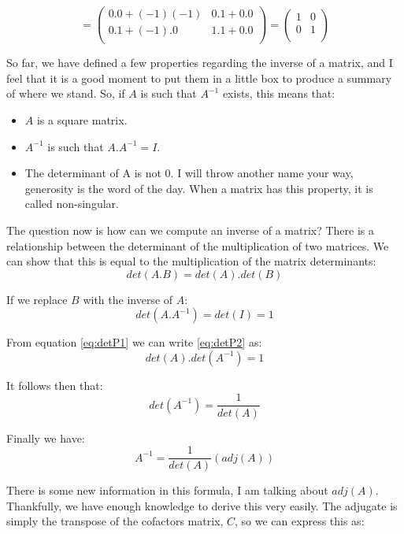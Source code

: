 \documentclass[a4,12pt,twosided,openany]{memoir}
\begin{document}
\[ = \begin{pmatrix}
0.0 + (-1)(-1) & 0.1 + 0.0\\
0.1 + (-1).0  & 1.1 + 0.0\\
\end{pmatrix} = \begin{pmatrix}
1 & 0\\
0 & 1\\
\end{pmatrix}\]
\par 
\indent
So far, we have defined a few properties regarding the inverse of a matrix, and I feel that it is a good moment to put them in a little box to produce a summary of where we stand. So, if $A$ is such that $A^{−1}$ exists, this means that:
\begin{tcolorbox}
\begin{itemize}
\item $A$ is a square matrix.
\item $A^{-1}$ is such that $A.A^{-1} = I $.
\item The determinant of A is not 0. I will throw another name your way, generosity is the word of the day. When a matrix has this property, it is called non-singular.
\end{itemize}
\end{tcolorbox}
\par 
\indent
The question now is how can we compute an inverse of a matrix? There is a relationship between the determinant of the multiplication of two matrices. We can show that this is equal to the multiplication of the matrix determinants:
\begin{equation}\label{eq:detP1}
det(A.B) = det(A).det(B)
\end{equation}
\par 
\indent
If we replace $B$ with the inverse of $A$:
\begin{equation}\label{eq:detP2}
det(A.A^{-1}) = det(I) = 1
\end{equation}
\par 
\indent
From equation \ref{eq:detP1} we can write \ref{eq:detP2} as:
\[ det(A).det(A^{-1}) = 1 \]
\par 
\indent
It follows then that:
\[det(A^{-1}) =  \frac{1}{det(A)}\]
\par 
\indent
Finally we have:
\[A^{-1} =  \frac{1}{det(A)}(adj(A))\]
\par 
\indent
There is some new information in this formula, I am talking about $adj(A)$. Thankfully, we have enough knowledge to derive this very easily. The adjugate is simply the transpose of the cofactors matrix, $C$, so we can express this as:
\end{document}
